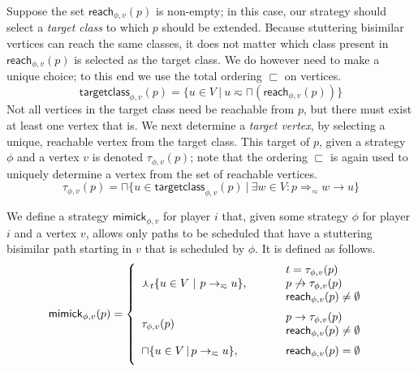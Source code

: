 \documentclass[a4paper]{llncs}
\newcommand{\To}{\ensuremath{\Longrightarrow}}
\newcommand{\mimick}{\mathsf{mimick}_{\phi,v}}
\newcommand{\stut}{\eqsim}\newcommand{\semistut}{\sim_{\mathrm{semi-st}}}
\newcommand{\entry}[2]{\mathsf{reach}_{#1}(#2)}
\newcommand{\vertexorder}{\ensuremath{\sqsubset}}
\newcommand{\vertexordermin}{\sqcap}
\newcommand{\targetordermin}[1]{\curlywedge_{#1}}
\newcommand{\targetclass}[2]{\mathsf{targetclass}_{#1}(#2)}
\newcommand{\target}[2]{\tau_{#1}(#2)}
\begin{document}
Suppose the set $\entry{\phi,v}{p}$ is non-empty; in this case, our strategy
should select a \emph{target class} to which $p$ should be extended. Because
stuttering bisimilar vertices can reach the same classes, it does not matter
which class present in $\entry{\phi,v}{p}$ is selected as the target class.
We do however need to make a unique choice; to this end we use the total
ordering $\vertexorder$ on vertices.
$$
\targetclass{\phi,v}{p} = \{ u \in V ~|~ u \stut \vertexordermin(\entry{\phi,v}{p}) \}
$$
Not all vertices in the target class need be reachable from $p$, but there
must exist at least one vertex that is.
We next determine a \emph{target vertex}, by selecting a unique, reachable
vertex from the target class. This
target of $p$, given a strategy $\phi$ and a vertex $v$ is denoted $\target{\phi,v}{p}$; note that
the ordering $\vertexorder$ is again used to uniquely determine a vertex from the set
of reachable vertices.
$$
\target{\phi,v}{p} =
\vertexordermin \{ u \in \targetclass{\phi,v}{p} ~|~ \exists w \in V: p \To_{\stut} w \to u \}
$$
\begin{definition}
We define a strategy $\mimick$ for player $i$ that, given some strategy $\phi$ for player $i$ and a vertex $v$, 
allows only paths to be scheduled that have a stuttering bisimilar
path starting in $v$ that is scheduled by $\phi$. It is defined as follows.
  $$
  \begin{array}{c}
  \mimick(p) = \left\{ 
    \begin{array}{ll}
     \targetordermin{t}\{u \in V ~|~ p \to_{\stut} u \}, 
       \qquad & 
       \begin{array}{l}
         t=\target{\phi,v}{p} \\
         p \not\to \target{\phi,v}{p} \\
         \entry{\phi,v}{p} \not= \emptyset
       \end{array} \medskip \\ 
         \target{\phi,v}{p}
       \qquad &
       \begin{array}{l}
        p \to \target{\phi,v}{p}\\
        \entry{\phi,v}{p} \not= \emptyset 
       \end{array} \medskip \\
     \vertexordermin\{u \in V \,|\, p \rightarrow_{\stut} u \}, & 
       \begin{array}{l}
         \entry{\phi,v}{p} = \emptyset
       \end{array} \medskip \\
    \end{array}
  \right.
  \end{array}
  $$
\end{definition}
\end{document}

